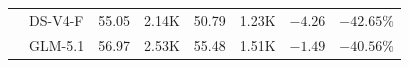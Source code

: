 \begin{table}[t]
\begin{threeparttable}
\begin{tabular}{ll *{6}{r}}
 & DS-V4-F & 55.05 & 2.14K & 50.79 & 1.23K & \textcolor{red!70!black}{$-4.26$} & \textcolor{green!50!black}{$-42.65\%$} \\
 & GLM-5.1 & 56.97 & 2.53K & 55.48 & 1.51K & \textcolor{red!70!black}{$-1.49$} & \textcolor{green!50!black}{$-40.56\%$} \\
\bottomrule
\end{tabular}
\end{threeparttable}
\end{table}
